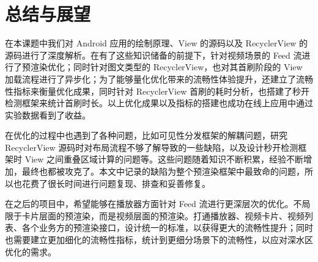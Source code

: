\chapter{总结与展望}

在本课题中我们对 Android 应用的绘制原理、View 的源码以及 RecyclerView 的源码进行了深度解析。在有了这些知识储备的前提下，针对视频场景的 Feed 流进行了预渲染优化；同时针对图文类型的 RecyclerView，也对其首刷阶段的 View 加载流程进行了异步化；为了能够量化优化带来的流畅性体验提升，还建立了流畅性指标来衡量优化成果，同时针对 RecyclerView 首刷的耗时分析，也搭建了秒开检测框架来统计首刷时长。以上优化成果以及指标的搭建也成功在线上应用中通过实验数据看到了收益。

在优化的过程中也遇到了各种问题，比如可见性分发框架的解耦问题，研究 RecyclerView 源码时对布局流程不够了解导致的一些缺陷，以及设计秒开检测框架时 View 之间重叠区域计算的问题等。这些问题随着知识不断积累，经验不断增加，最终也都被攻克了。本文中记录的缺陷为整个预渲染框架中最致命的问题，所以也花费了很长时间进行问题复现、排查和妥善修复。

在之后的项目中，希望能够在播放器方面针对 Feed 流进行更深层次的优化。不局限于卡片层面的预渲染，而是视频层面的预渲染。打通播放器、视频卡片、视频列表、各个业务方的预渲染接口，设计统一的标准，以获得更大的流畅性提升；同时也需要建立更加细化的流畅性指标，统计到更细分场景下的流畅性，以应对深水区优化的需求。